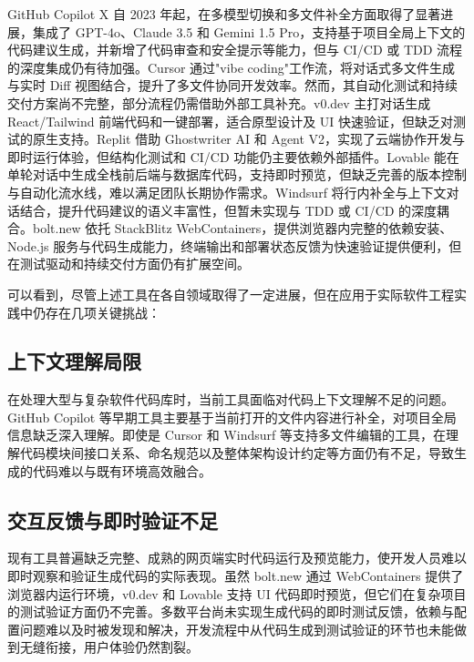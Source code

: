 GitHub Copilot X 自 2023 年起，在多模型切换和多文件补全方面取得了显著进展，集成了 GPT-4o、Claude 3.5 和 Gemini 1.5 Pro，支持基于项目全局上下文的代码建议生成，并新增了代码审查和安全提示等能力，但与 CI/CD 或 TDD 流程的深度集成仍有待加强\cite{copilotx2023}。Cursor 通过"vibe coding"工作流，将对话式多文件生成与实时 Diff 视图结合，提升了多文件协同开发效率。然而，其自动化测试和持续交付方案尚不完整，部分流程仍需借助外部工具补充\cite{cursor2025wiki}。v0.dev 主打对话生成 React/Tailwind 前端代码和一键部署，适合原型设计及 UI 快速验证，但缺乏对测试的原生支持\cite{v0dev2024}。Replit 借助 Ghostwriter AI 和 Agent V2，实现了云端协作开发与即时运行体验，但结构化测试和 CI/CD 功能仍主要依赖外部插件\cite{replit2025wiki}。Lovable 能在单轮对话中生成全栈前后端与数据库代码，支持即时预览，但缺乏完善的版本控制与自动化流水线，难以满足团队长期协作需求\cite{lovable2025times}。Windsurf 将行内补全与上下文对话结合，提升代码建议的语义丰富性，但暂未实现与 TDD 或 CI/CD 的深度耦合\cite{windsurf2024}。bolt.new 依托 StackBlitz WebContainers，提供浏览器内完整的依赖安装、Node.js 服务与代码生成能力，终端输出和部署状态反馈为快速验证提供便利，但在测试驱动和持续交付方面仍有扩展空间\cite{arunachalam2024boltnew,boltnewgithub2024}。

可以看到，尽管上述工具在各自领域取得了一定进展，但在应用于实际软件工程实践中仍存在几项关键挑战：

\subsection{上下文理解局限}

在处理大型与复杂软件代码库时，当前工具面临对代码上下文理解不足的问题。GitHub Copilot 等早期工具主要基于当前打开的文件内容进行补全，对项目全局信息缺乏深入理解\cite{DivaCopilot}。即使是 Cursor 和 Windsurf 等支持多文件编辑的工具，在理解代码模块间接口关系、命名规范以及整体架构设计约定等方面仍有不足，导致生成的代码难以与既有环境高效融合。

\subsection{交互反馈与即时验证不足}

现有工具普遍缺乏完整、成熟的网页端实时代码运行及预览能力，使开发人员难以即时观察和验证生成代码的实际表现。虽然 bolt.new 通过 WebContainers 提供了浏览器内运行环境，v0.dev 和 Lovable 支持 UI 代码即时预览，但它们在复杂项目的测试验证方面仍不完善。多数平台尚未实现生成代码的即时测试反馈，依赖与配置问题难以及时被发现和解决，开发流程中从代码生成到测试验证的环节也未能做到无缝衔接，用户体验仍然割裂。

